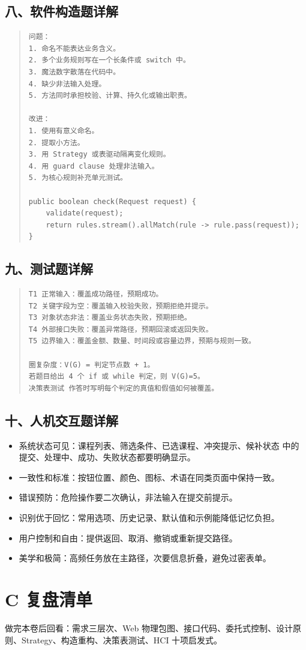 \documentclass[UTF8,zihao=-4]{ctexart}
\begin{document}
\subsection{八、软件构造题详解}


\begin{quote}
\footnotesize
\begin{verbatim}
问题：
1. 命名不能表达业务含义。
2. 多个业务规则写在一个长条件或 switch 中。
3. 魔法数字散落在代码中。
4. 缺少非法输入处理。
5. 方法同时承担校验、计算、持久化或输出职责。

改进：
1. 使用有意义命名。
2. 提取小方法。
3. 用 Strategy 或表驱动隔离变化规则。
4. 用 guard clause 处理非法输入。
5. 为核心规则补充单元测试。

public boolean check(Request request) {
    validate(request);
    return rules.stream().allMatch(rule -> rule.pass(request));
}
\end{verbatim}
\end{quote}



\subsection{九、测试题详解}


\begin{quote}
\footnotesize
\begin{verbatim}
T1 正常输入：覆盖成功路径，预期成功。
T2 关键字段为空：覆盖输入校验失败，预期拒绝并提示。
T3 对象状态非法：覆盖业务状态失败，预期拒绝。
T4 外部接口失败：覆盖异常路径，预期回滚或返回失败。
T5 边界输入：覆盖金额、数量、时间段或容量边界，预期与规则一致。

圈复杂度：V(G) = 判定节点数 + 1。
若题目给出 4 个 if 或 while 判定，则 V(G)=5。
决策表测试 作答时写明每个判定的真值和假值如何被覆盖。
\end{verbatim}
\end{quote}



\subsection{十、人机交互题详解}


\begin{itemize}
\item 系统状态可见：课程列表、筛选条件、已选课程、冲突提示、候补状态 中的提交、处理中、成功、失败状态都要明确显示。
\item 一致性和标准：按钮位置、颜色、图标、术语在同类页面中保持一致。
\item 错误预防：危险操作要二次确认，非法输入在提交前提示。
\item 识别优于回忆：常用选项、历史记录、默认值和示例能降低记忆负担。
\item 用户控制和自由：提供返回、取消、撤销或重新提交路径。
\item 美学和极简：高频任务放在主路径，次要信息折叠，避免过密表单。
\end{itemize}



\section{C 复盘清单}


做完本卷后回看：需求三层次、Web 物理包图、接口代码、委托式控制、设计原则、Strategy、构造重构、决策表测试、HCI 十项启发式。
\end{document}

